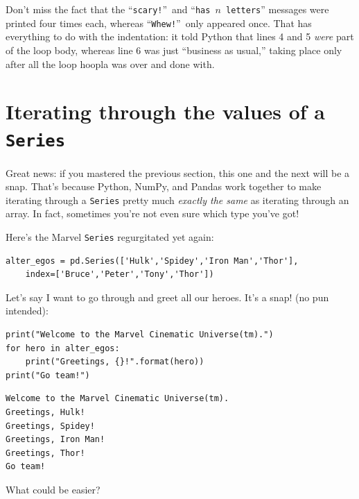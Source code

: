 Don't miss the fact that the ``\texttt{scary!}''~and ``\texttt{has $n$
letters}'' messages were printed four times each, whereas
``\texttt{Whew!}''~only appeared once. That has everything to do with the
indentation: it told Python that lines 4 and 5 \textit{were} part of the loop
body, whereas line 6 was just ``business as usual,'' taking place only after
all the loop hoopla was over and done with.

\section{Iterating through the values of a \texttt{Series}}

\label{seriesLoops}

Great news: if you mastered the previous section, this one and the next will be
a snap. That's because Python, NumPy, and Pandas work together to make
iterating through a \texttt{Series} pretty much \textit{exactly the same} as
iterating through an array. In fact, sometimes you're not even sure which type
you've got!


\pagebreak
Here's the Marvel \texttt{Series} regurgitated yet again:

\begin{Verbatim}[fontsize=\footnotesize,samepage=true,frame=single,framesep=3mm]
alter_egos = pd.Series(['Hulk','Spidey','Iron Man','Thor'],
    index=['Bruce','Peter','Tony','Thor'])
\end{Verbatim}


Let's say I want to go through and greet all our heroes. It's a snap! (no pun
intended):

\begin{Verbatim}[fontsize=\small,samepage=true,frame=single,framesep=3mm]
print("Welcome to the Marvel Cinematic Universe(tm).")
for hero in alter_egos:
    print("Greetings, {}!".format(hero))
print("Go team!")
\end{Verbatim}

\begin{Verbatim}[fontsize=\small,samepage=true,frame=leftline,framesep=5mm,framerule=1mm]
Welcome to the Marvel Cinematic Universe(tm).
Greetings, Hulk!
Greetings, Spidey!
Greetings, Iron Man!
Greetings, Thor!
Go team!
\end{Verbatim}

What could be easier?


